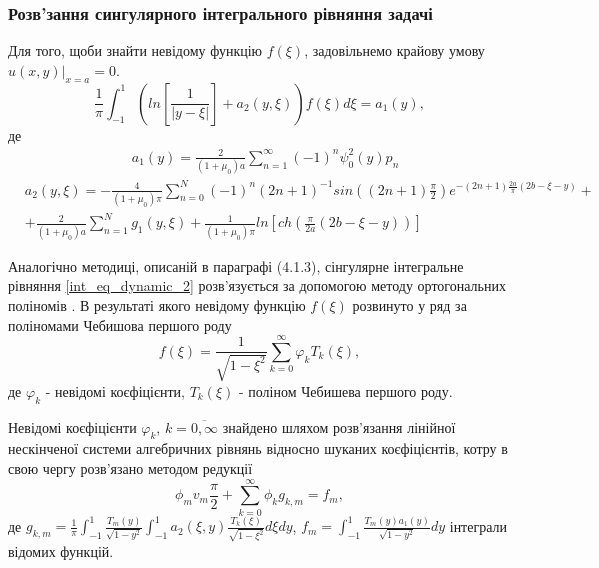 \subsubsection{Розв'зання сингулярного інтегрального рівняння задачі}
Для того, щоби знайти невідому функцію $f(\xi)$, задовільнемо крайову умову $u(x, y) |_{x=a} = 0$.
\begin{equation}\label{int_eq_dynamic_2}
    \frac{1}{\pi} \int_{-1}^{1} \left( ln\left[ \frac{1}{\lvert y - \xi \rvert} \right] + a_2(y, \xi) \right) f(\xi) d\xi = a_1(y),
\end{equation}
де
\begin{align*}
    &a_1(y) = \frac{2}{(1 + \mu_0)a}  \sum_{n=1}^{\infty} (-1)^n \psi_0^2(y) p_n
\end{align*}
\begin{align*}
    &a_2(y, \xi) = - \frac{4}{(1 + \mu_0)\pi} \sum_{n=0}^{N} (-1)^n(2n + 1)^{-1} sin((2n + 1) \frac{\pi}{2}) e^{-(2n + 1)\frac{2a}{\pi} (2b - \xi - y)} + \\
    &+  \frac{2}{(1 + \mu_0)a} \sum_{n=1}^{N} g_1(y, \xi) + \frac{1}{(1 + \mu_0)\pi} ln\left[ ch(\frac{\pi}{2a}(2b - \xi - y))\right]
\end{align*}

Аналогічно методиці, описаній в параграфі (4.1.3), сінгулярне інтегральне рівняння \eqref{int_eq_dynamic_2}
розв'язується за допомогою методу ортогональних поліномів \cite{popov_3}.
В результаті якого невідому функцію $f(\xi)$ розвинуто у ряд за поліномами Чебишова першого роду
\begin{equation}\label{unk_fun_dynamic_2}
    f(\xi) = \frac{1}{\sqrt{1 - \xi^2}} \sum_{k=0}^{\infty} \varphi_k T_{k}(\xi),
\end{equation}
де $\varphi_k$ - невідомі коєфіцієнти, $T_{k}(\xi)$ - поліном Чебишева першого роду.

Невідомі коєфіцієнти $\varphi_k$, $k=\overline{0, \infty}$ знайдено шляхом розв'язання лінійної нескінченої системи алгебричних рівнянь відносно шуканих коєфіцієнтів,
котру в свою чергу розв'язано методом редукції
\begin{equation}\label{int_system_dynamic_2}
    \phi_m v_m \frac{\pi}{2} + \sum_{k=0}^{\infty} \phi_k g_{k, m} = f_m,
\end{equation}
де $g_{k, m} = \frac{1}{\pi} \int_{-1}^{1} \frac{T_{m}(y)}{\sqrt{1 - y^2}} \int_{-1}^{1} a_2(\xi, y) \frac{T_{k}(\xi)}{\sqrt{1 - \xi^2}} d\xi dy$,
$f_m = \int_{-1}^{1} \frac{T_{m}(y) a_1(y)}{\sqrt{1 - y^2}} dy$ інтеграли відомих функцій.
